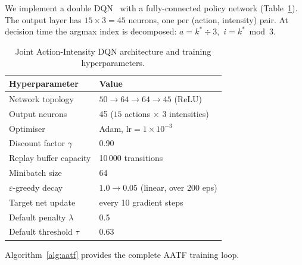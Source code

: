 \documentclass[sigconf]{acmart}
\begin{document}
We implement a double DQN~\cite{mnih2015human} with a fully-connected
policy network (Table~\ref{tab:dqn}). The output layer has
$15 \times 3 = 45$ neurons, one per (action, intensity) pair. At
decision time the argmax index is decomposed:
$a = k^* \div 3$,~$i = k^* \bmod 3$.

\begin{table}[t]
\caption{Joint Action-Intensity DQN architecture and training hyperparameters.}
\label{tab:dqn}
\centering
\small
\begin{tabular}{l l}
\toprule
Hyperparameter & Value \\
\midrule
Network topology      & $50\!\to\!64\!\to\!64\!\to\!45$ (ReLU) \\
Output neurons        & 45 \; ($15$ actions $\times$ 3 intensities) \\
Optimiser             & Adam, $\mathrm{lr} = 1\!\times\!10^{-3}$ \\
Discount factor $\gamma$ & 0.90 \\
Replay buffer capacity & 10\,000 transitions \\
Minibatch size        & 64 \\
$\varepsilon$-greedy decay & $1.0 \to 0.05$ (linear, over 200 eps) \\
Target net update     & every 10 gradient steps \\
Default penalty $\lambda$ & 0.5 \\
Default threshold $\tau$ & 0.63 \\
\bottomrule
\end{tabular}
\end{table}

\noindent
Algorithm~\ref{alg:aatf} provides the complete AATF training loop.
\end{document}
